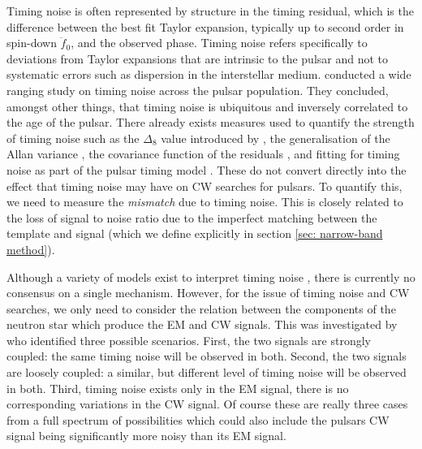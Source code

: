\documentclass[../full_thesis/full_thesis.tex]{subfiles}
\begin{document}
Timing noise is
often represented by structure in the timing residual, which is the difference
between the best fit Taylor expansion, typically up to second order in spin-down
$\ddot{f}_0$, and the observed phase. Timing noise refers specifically to
deviations from Taylor expansions that are intrinsic to the pulsar and not to
systematic errors such as dispersion in the interstellar medium.
\citet{Hobbs2010} conducted a wide ranging study on timing noise across the
pulsar population.  They concluded, amongst other things, that timing noise is
ubiquitous and inversely correlated to the age of the pulsar.  There already
exists measures used to quantify the strength of timing noise such as the
$\Delta_{8}$ value introduced by \citet{Arzoumanian1994}, the generalisation
of the Allan variance \citep{Matsakis1997}, the covariance function of the
residuals \citep{Coles2011}, and fitting for timing noise as part of the pulsar
timing model \citep{Lentati2014}. These do not convert directly 
into the effect that timing noise may have on CW searches for pulsars. To quantify this, we
need to measure the \emph{mismatch} due to timing noise. This is closely
related to the loss of signal to noise ratio due to the imperfect matching
between the template and signal (which we define explicitly in section
\ref{sec: narrow-band method}).

Although a variety of models exist to interpret timing noise \citep{Lyne2010, Cordes1981}, there is
currently no consensus on a single mechanism. However, for the issue of timing
noise and CW searches, we only need to consider the relation between the
components of the neutron star which produce the EM and CW signals.  This was
investigated by \citet{Jones2004} who identified three possible scenarios.
First, the two signals are strongly coupled: the same timing noise will be
observed in both. Second, the two signals are loosely coupled: a similar, but
different level of timing noise will be observed in both. Third, timing noise
exists only in the EM signal, there is no corresponding variations in the CW
signal. Of course these are really three cases from a full spectrum of
possibilities which could also include the pulsars CW signal being significantly more noisy than its EM signal.
\end{document}
